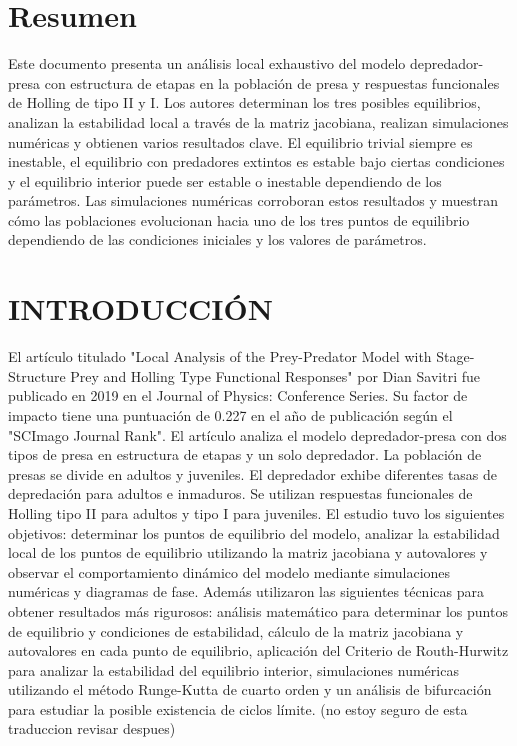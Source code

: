 \documentclass{wscpaperproc}
\theoremstyle{wsc}
\begin{document}
\maketitle

\section*{Resumen}
Este documento presenta un análisis local exhaustivo del modelo depredador-presa con estructura de
etapas en la población de presa y respuestas funcionales de Holling de tipo II y I. Los autores determinan
los tres posibles equilibrios, analizan la estabilidad local a través de la matriz jacobiana, realizan
simulaciones numéricas y obtienen varios resultados clave. El equilibrio trivial siempre es inestable,
el equilibrio con predadores extintos es estable bajo ciertas condiciones y el equilibrio interior puede
ser estable o inestable dependiendo de los parámetros. Las simulaciones numéricas corroboran estos resultados
y muestran cómo las poblaciones evolucionan hacia uno de los tres puntos de equilibrio dependiendo de las
condiciones iniciales y los valores de parámetros.

\section{INTRODUCCI\'ON}
\label{sec:intro}
El artículo titulado "Local Analysis of the Prey-Predator Model with Stage-Structure Prey and Holling
Type Functional Responses" por Dian Savitri fue publicado en 2019
en el Journal of Physics: Conference Series. Su factor de impacto tiene una puntuaci\'on de 0.227 en el año de 
publicación según el "SCImago Journal Rank". El artículo analiza el modelo depredador-presa con dos tipos de presa en estructura
de etapas y un solo depredador. La población de presas se divide en adultos y juveniles. El depredador
exhibe diferentes tasas de depredación para adultos e inmaduros. Se utilizan respuestas funcionales de
Holling tipo II \cite{holling_functional_1965} para adultos y tipo I para juveniles. El estudio tuvo los siguientes objetivos:
determinar los puntos de equilibrio del modelo, analizar la estabilidad local de los puntos de equilibrio
utilizando la matriz jacobiana y autovalores y observar el comportamiento dinámico del modelo mediante
simulaciones numéricas y diagramas de fase. Además utilizaron las siguientes técnicas para obtener resultados
más rigurosos: análisis matemático para determinar los puntos de equilibrio y condiciones de estabilidad,
cálculo de la matriz jacobiana y autovalores en cada punto de equilibrio, aplicación del Criterio de Routh-Hurwitz
para analizar la estabilidad del equilibrio interior, simulaciones numéricas utilizando el método Runge-Kutta de
cuarto orden y un análisis de bifurcación para estudiar la posible existencia de ciclos límite. (no estoy seguro de esta traduccion revisar despues)
\end{document}
